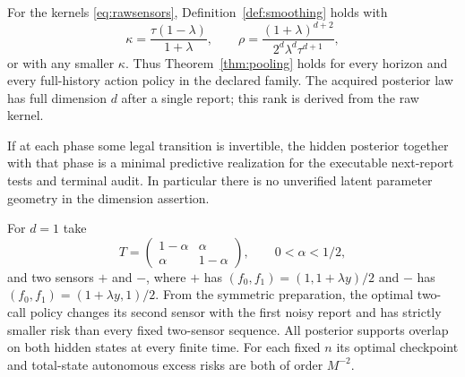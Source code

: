 \begin{theorem}\label{thm:sensors}
For the kernels \eqref{eq:rawsensors}, Definition~\ref{def:smoothing} holds with
\begin{equation}\label{eq:sensorconstants}
 \kappa=\frac{\tau(1-\lambda)}{1+\lambda},\qquad
 \rho=\frac{(1+\lambda)^{d+2}}{2^d\lambda^d\tau^{d+1}},
\end{equation}
or with any smaller $\kappa$. Thus Theorem~\ref{thm:pooling} holds for every horizon and every full-history action policy in the declared family. The acquired posterior law has full dimension $d$ after a single report; this rank is derived from the raw kernel.

If at each phase some legal transition is invertible, the hidden posterior together with that phase is a minimal predictive realization for the executable next-report tests and terminal audit. In particular there is no unverified latent parameter geometry in the dimension assertion.

For $d=1$ take
\[
 T=\begin{pmatrix}1-\alpha&\alpha\\\alpha&1-\alpha\end{pmatrix},
       \qquad 0<\alpha<1/2,
\]
and two sensors $+$ and $-$, where $+$ has $(f_0,f_1)=(1,1+\lambda y)/2$ and $-$ has $(f_0,f_1)=(1+\lambda y,1)/2$. From the symmetric preparation, the optimal two-call policy changes its second sensor with the first noisy report and has strictly smaller risk than every fixed two-sensor sequence. All posterior supports overlap on both hidden states at every finite time. For each fixed $n$ its optimal checkpoint and total-state autonomous excess risks are both of order $M^{-2}$.
\end{theorem}
